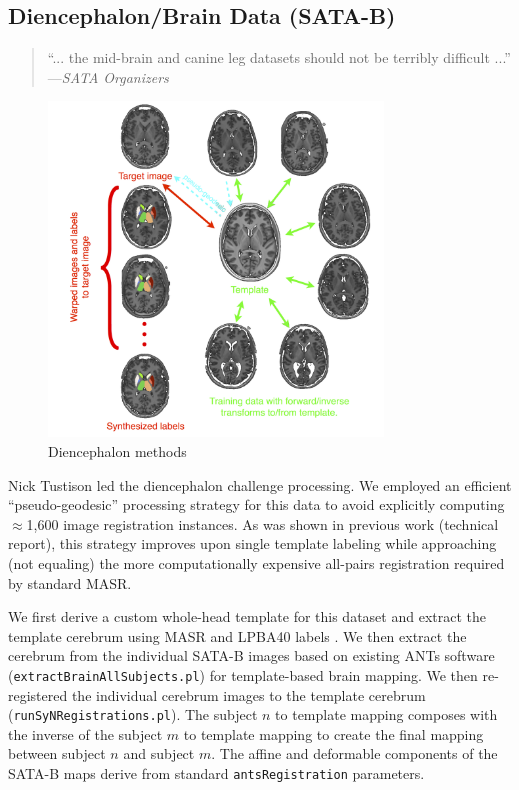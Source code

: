 \documentclass{llncs}
\begin{document}
\subsection{Diencephalon/Brain Data (SATA-B)}
 \begin{quote}
 ``... the mid-brain and canine leg
  datasets should not be terribly difficult ...'' ---{\em SATA Organizers}
\end{quote}
\begin{figure}[t]
 \centering 
  \includegraphics[width=3.5in]{../figs/SATA_diencephalon.png}
 \caption{Diencephalon methods}
 \label{fig:DIEmethods}
\end{figure}
Nick Tustison led the diencephalon challenge processing.  We employed
an efficient ``pseudo-geodesic'' processing strategy for this data to
avoid explicitly computing $\approx$1,600 image registration
instances.  As was shown in previous work (technical report), this
strategy improves upon single template labeling while approaching (not
equaling) the more computationally expensive all-pairs
registration required by standard MASR.

We first derive a custom whole-head template for this dataset and
extract the template cerebrum using MASR and LPBA40 labels \cite{}.
We then extract the cerebrum from the individual SATA-B images based
on existing ANTs software (\texttt{extractBrainAllSubjects.pl}) for
template-based brain mapping.  We then re-registered the individual
cerebrum images to the template cerebrum
(\texttt{runSyNRegistrations.pl}).  The subject $n$ to template
mapping composes with the inverse of the subject $m$ to template
mapping to create the final mapping between subject $n$ and subject $m$.
The affine and deformable components of the SATA-B maps derive from standard \texttt{antsRegistration} parameters.
 
\end{document}
